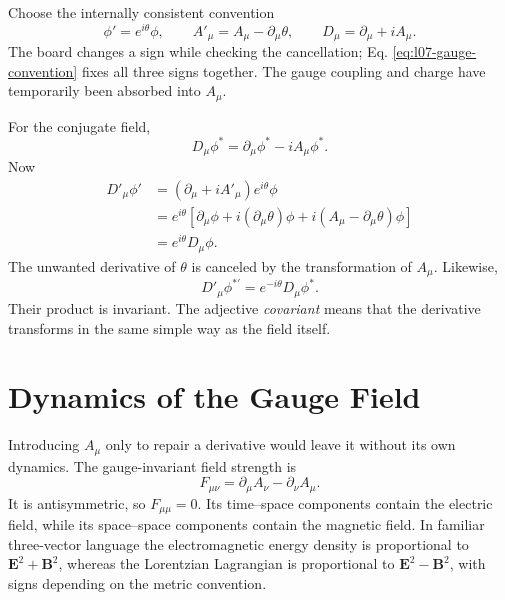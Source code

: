 Choose the internally consistent convention
\begin{equation}
  \phi'=e^{i\theta}\phi,
  \qquad
  A'_\mu=A_\mu-\partial_\mu\theta,
  \qquad
  D_\mu=\partial_\mu+iA_\mu.
  \label{eq:l07-gauge-convention}
\end{equation}
The board changes a sign while checking the cancellation; Eq.
\eqref{eq:l07-gauge-convention} fixes all three signs together. The gauge
coupling and charge have temporarily been absorbed into \(A_\mu\).

For the conjugate field,
\begin{equation}
  D_\mu\phi^*=\partial_\mu\phi^*-iA_\mu\phi^*.
\end{equation}
Now
\begin{align}
  D'_\mu\phi'
  &=
  \left(\partial_\mu+iA'_\mu\right)e^{i\theta}\phi
  \nonumber\\
  &=
  e^{i\theta}
  \left[
    \partial_\mu\phi+i(\partial_\mu\theta)\phi
    +i(A_\mu-\partial_\mu\theta)\phi
  \right]
  \nonumber\\
  &=e^{i\theta}D_\mu\phi.
  \label{eq:l07-covariant-transform}
\end{align}
The unwanted derivative of \(\theta\) is canceled by the transformation of
\(A_\mu\). Likewise,
\begin{equation}
  D'_\mu\phi^{*\prime}=e^{-i\theta}D_\mu\phi^*.
\end{equation}
Their product is invariant. The adjective \emph{covariant} means that the
derivative transforms in the same simple way as the field itself.

\section{Dynamics of the Gauge Field}

Introducing \(A_\mu\) only to repair a derivative would leave it without its
own dynamics. The gauge-invariant field strength is
\begin{equation}
  F_{\mu\nu}
  =\partial_\mu A_\nu-\partial_\nu A_\mu.
  \label{eq:l07-field-strength}
\end{equation}
It is antisymmetric, so \(F_{\mu\mu}=0\). Its time--space components contain
the electric field, while its space--space components contain the magnetic
field. In familiar three-vector language the electromagnetic energy density
is proportional to \(\bm E^2+\bm B^2\), whereas the Lorentzian Lagrangian is
proportional to \(\bm E^2-\bm B^2\), with signs depending on the metric
convention.

